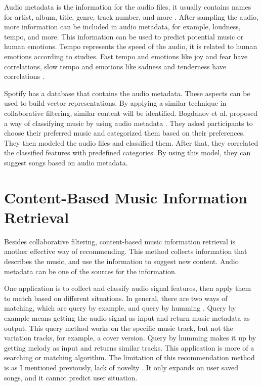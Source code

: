Audio metadata is the information for the audio files, it usually contains names for artist, album, title, genre, track number, and more \cite{audio2018}. After sampling the audio, more information can be included in audio metadata, for example, loudness, tempo, and more. This information can be used to predict potential music or human emotions. Tempo represents the speed of the audio, it is related to human emotions according to studies. Fast tempo and emotions like joy and fear have correlations, slow tempo and emotions like sadness and tenderness have correlations \cite{kamenetsky1997effect}.

Spotify has a database that contains the audio metadata. These aspects can be used to build vector representations. By applying a similar technique in collaborative filtering, similar content will be identified. Bogdanov et al. proposed a way of classifying music by using audio metadata \cite{bogdanov2013semantic}. They asked participants to choose their preferred music and categorized them based on their preferences. They then modeled the audio files and classified them. After that, they correlated the classified features with predefined categories. By using this model, they can suggest songs based on audio metadata.

\section{Content-Based Music Information Retrieval}

Besides collaborative filtering, content-based music information retrieval is another effective way of recommending. This method collects information that describes the music, and use the information to suggest new content. Audio metadata can be one of the sources for the information.

One application is to collect and classify audio signal features, then apply them to match based on different situations. In general, there are two ways of matching, which are query by example, and query by humming \cite{Kaminskas2012}. Query by example means getting the audio signal as input and return music metadata as output. This query method works on the specific music track, but not the variation tracks, for example, a cover version. Query by humming makes it up by getting melody as input and returns similar tracks. This application is more of a searching or matching algorithm. The limitation of this recommendation method is as I mentioned previously, lack of novelty \cite{Kaminskas2012}. It only expands on user saved songs, and it cannot predict user situation.

